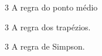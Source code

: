 \documentclass[\mainfilename]{subfiles}
\begin{document}
\begin{questionBox}
\begin{questionBox}
        \begin{questionBox}3{ %
            A regra do ponto médio
        } %
        \end{questionBox}
        \begin{questionBox}3{ %
            A regra dos trapézios.
        } %
        \end{questionBox}
        \begin{questionBox}3{ %
            A regra de Simpson.
        } %
        \end{questionBox}
    \end{questionBox}
\end{questionBox}
\end{document}
